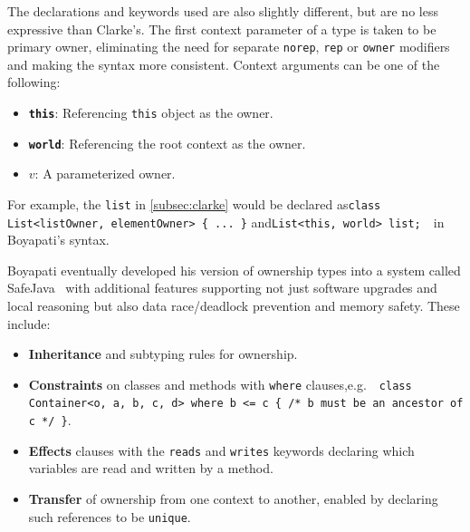 \documentclass{acm_proc_article-sp}
\begin{document}
The declarations and keywords used are also slightly different, but are no less
expressive than Clarke's. The first context parameter of a type is taken to be
primary owner, eliminating the need for separate \lstinline|norep|,
\lstinline|rep| or \lstinline|owner| modifiers and making the syntax more
consistent. Context arguments can be one of the following: \vspace{-0.5ex}
\begin{itemize}
	\setlength\itemsep{-0.2ex}
	\item \textbf{\lstinline|this|}:
		Referencing \lstinline|this| object as the owner.
	\item \textbf{\lstinline|world|}:
		Referencing the root context as the owner.
	\item \textbf{$v$}:
		A parameterized owner.
\end{itemize} \vspace{-0.5ex}

For example, the \lstinline|list| in \cref{subsec:clarke} would be declared
as\linebreak\lstinline|class List<listOwner, elementOwner> { ... }|
and\linebreak\lstinline|List<this, world> list;|~~in Boyapati's syntax.

Boyapati eventually developed his version of ownership types into a system
called SafeJava~\cite{boyapati04safejava} with additional features supporting
not just software upgrades and local reasoning but also data race/deadlock
prevention and memory safety. These include: \vspace{-0.5ex}
\begin{itemize}
	\setlength\itemsep{-0.2ex}
	\item \textbf{Inheritance} and subtyping rules for ownership.
	\item \textbf{Constraints} on classes and methods with \lstinline|where|
clauses,\linebreak e.g.~~\lstinline|class Container<o, a, b, c, d> where b <= c { /* b must be an ancestor of c */ }|.
	\item \textbf{Effects} clauses with the \lstinline|reads| and
\lstinline|writes| keywords declaring which variables are read and written by a
method.
	\item \textbf{Transfer} of ownership from one context to another, enabled by
declaring such references to be \lstinline|unique|.
\end{itemize} \vspace{-0.5ex}
\end{document}
